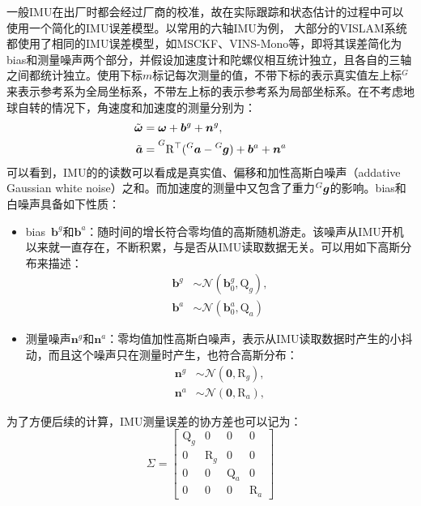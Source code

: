 一般IMU在出厂时都会经过厂商的校准，故在实际跟踪和状态估计的过程中可以使用一个简化的IMU误差模型。以常用的六轴IMU为例，
大部分的VISLAM系统都使用了相同的IMU误差模型，如MSCKF、VINS-Mono等，即将其误差简化为bias和测量噪声两个部分，并假设加速度计和陀螺仪相互统计独立，且各自的三轴之间都统计独立。使用下标$m$标记每次测量的值，不带下标的表示真实值左上标$^G$来表示参考系为全局坐标系，不带左上标的表示参考系为局部坐标系。在不考虑地球自转的情况下，角速度和加速度的测量分别为：
\begin{equation}
\begin{aligned}
    \tilde{\bm{\omega}}
        &= \bm{\omega} + \bm{b}^g + \bm{n}^g,  \\
    \tilde{\bm a}
        &= \prescript{G}{}{\mathrm{R}^\top}
            (\prescript{G}{}{\bm a} - \prescript{G}{}{\bm{g}}) +
                \bm{b}^a + \bm{n}^a
\end{aligned}
\end{equation}
可以看到，IMU的的读数可以看成是真实值、偏移和加性高斯白噪声（addative Gaussian white noise）之和。而加速度的测量中又包含了重力$\prescript{G}{}{\bm g}$的影响。bias和白噪声具备如下性质：
\begin{itemize}
    \item bias~$\bm{b}^g$和$\bm{b}^a$：随时间的增长符合零均值的高斯随机游走。该噪声从IMU开机以来就一直存在，不断积累，与是否从IMU读取数据无关。可以用如下高斯分布来描述：
        \begin{equation}
        \begin{aligned}
            \bm{b}^g &\sim \mathcal{N}(\bm{b}_0^g, \mathrm{Q}_g), \\
            \bm{b}^a &\sim \mathcal{N}(\bm{b}_0^a, \mathrm{Q}_a)
        \end{aligned}
        \end{equation}
    \item 测量噪声$\bm{n}^g$和$\bm{n}^a$：零均值加性高斯白噪声，表示从IMU读取数据时产生的小抖动，而且这个噪声只在测量时产生，也符合高斯分布：
        \begin{equation}
        \begin{aligned}
            \bm{n}^g & \sim \mathcal{N}(\bm{0}, \mathrm{R}_g), \\
            \bm{n}^a & \sim \mathcal{N}(\bm{0}, \mathrm{R}_a),
        \end{aligned}
        \end{equation}
\end{itemize}
为了方便后续的计算，IMU测量误差的协方差也可以记为：
\begin{equation}
\Sigma =
    \begin{bmatrix}
        \mathrm{Q}_g &            0 &            0 &         0 \\
                   0 & \mathrm{R}_g &            0 &         0 \\
                   0 &            0 & \mathrm{Q}_a &         0 \\
                   0 &            0 &            0 & \mathrm{R}_a
    \end{bmatrix}
\end{equation}

